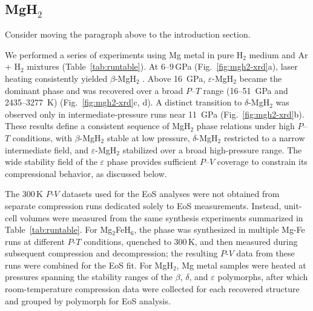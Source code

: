 \documentclass[draft,jgrga,12pt]{agujournal2019}
\begin{document}
\subsection{MgH$_2$}


\begin{cbox}
Consider moving the paragraph above to the introduction section.\\
\end{cbox}

We performed a series of experiments using Mg metal in pure H$_2$ medium and Ar + H$_2$ mixtures (Table~\ref{tab:runtable}).
At 6--9\,{GPa} (Fig.~\ref{fig:mgh2-xrd}a), laser heating consistently yielded $\beta$-MgH$_2$ \cite{bastide_polymorphisme_1980}. 
Above 16~{GPa}, $\varepsilon$-MgH$_2$ \cite{moriwaki_structural_2006} became the dominant phase and was recovered over a broad $P$–$T$ range (16--51~{GPa} and 2435--3277~K) (Fig.~\ref{fig:mgh2-xrd}c, d). 
A distinct transition to $\delta$-MgH$_2$ \cite{moriwaki_structural_2006} was observed only in intermediate-pressure runs near 11~{GPa} (Fig.~\ref{fig:mgh2-xrd}b).  
These results define a consistent sequence of MgH$_2$ phase relations under high {$P$–$T$} conditions, with $\beta$-MgH$_2$ stable at low pressure, $\delta$-MgH$_2$ restricted to a narrow intermediate field, and $\varepsilon$-MgH$_2$ stabilized over a broad high-pressure range. 
The wide stability field of the $\varepsilon$ phase provides sufficient $P$–$V$ coverage to constrain its compressional behavior, as discussed below.

The 300\,K $P$-$V$ datasets used for the EoS analyses were not obtained from separate compression runs dedicated solely to EoS measurements. 
Instead, unit-cell volumes were measured from the same synthesis experiments summarized in Table~\ref{tab:runtable}. 
For Mg$_2$FeH$_6$, the phase was synthesized in multiple Mg-Fe runs at different $P$-$T$ conditions, quenched to 300\,K, and then measured during subsequent compression and decompression; the resulting $P$-$V$ data from these runs were combined for the EoS fit. 
For MgH$_2$, Mg metal samples were heated at pressures spanning the stability ranges of the $\beta$, $\delta$, and $\varepsilon$ polymorphs, after which room-temperature compression data were collected for each recovered structure and grouped by polymorph for EoS analysis.
\end{document}
